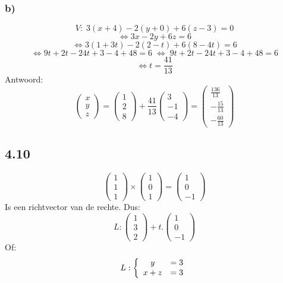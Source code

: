 \documentclass[11pt]{article}
\begin{document}
\subsubsection*{b)}
\[
V:\;3(x+4)-2(y+0)+6(z-3)=0
\]
\[
\Leftrightarrow 3x-2y+6z=6
\]
\[
\Leftrightarrow 3(1+3t)-2(2-t)+6(8-4t)=6
\]
\[
\Leftrightarrow 9t+2t-24t+3-4+48=6\;\Leftrightarrow\; 9t+2t-24t+3-4+48=6
\]
\[
\Leftrightarrow t=\frac{41}{13}
\]
Antwoord:\\
\[
\begin{pmatrix}
x\\y\\z
\end{pmatrix}=\begin{pmatrix}
1\\2\\8
\end{pmatrix}+\frac{41}{13}
\begin{pmatrix}
3\\-1\\-4
\end{pmatrix}=\begin{pmatrix}
\frac{136}{13}\\-\frac{15}{13}\\-\frac{60}{13}
\end{pmatrix}
\]

\subsection*{4.10}
\[
\begin{pmatrix}
1\\1\\1
\end{pmatrix}
\times
\begin{pmatrix}
1\\0\\1
\end{pmatrix}
=
\begin{pmatrix}
1\\0\\-1
\end{pmatrix}
\]
Is een richtvector van de rechte.
Dus:
\[
L: \begin{pmatrix}
1\\3\\2
\end{pmatrix}
+
t.\begin{pmatrix}
1\\0\\-1
\end{pmatrix}
\]
Of:\\
\[
L: \left\lbrace
\begin{array}{c c}
y &= 3\\
x+z&=3
\end{array}
\right.
\]
\end{document}
